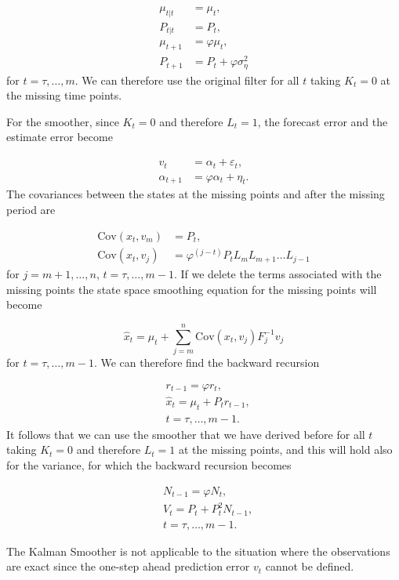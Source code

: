 \documentclass[11pt,a4paper]{article}
\newcommand{\cov}{\mathrm{Cov}}
\begin{document}
\begin{align*}
    \mu_{t|t} &= \mu_t,\\
    P_{t|t} &= P_t,\\
    \mu_{t+1} &= \varphi \mu_t,\\
    P_{t+1} &= P_t + \varphi \sigma^2_\eta
\end{align*}
for $t = \tau, \dots, m$. We can therefore use the original filter for all $t$ taking $K_t = 0$ at the missing time points.

For the smoother, since $K_t = 0$ and therefore $L_t = 1$, the forecast error and the estimate error become

\begin{align*}
    v_t &= \alpha_t + \varepsilon_t,\\
    \alpha_{t+1} &= \varphi \alpha_t + \eta_t.
\end{align*}
The covariances between the states at the missing points and after the missing period are

\begin{align*}
    \cov(x_t, v_m) &= P_t,\\
    \cov(x_t, v_j) &= \varphi^{(j-t)} P_t L_m L_{m+1} \dots L_{j-1}
\end{align*}
for $j = m+1, \dots, n$, $t = \tau, \dots, m - 1$.
If we delete the terms associated with the missing points the state space smoothing equation for the missing points will become

\[
    \hat{x}_t = \mu_t + \sum^n_{j=m}\cov (x_t, v_j)F_j^{-1}v_j
\]
for $t = \tau, \dots, m-1$. We can therefore find the backward recursion

\begin{align*}
    &r_{t-1} = \varphi r_t,\\
    &\hat{x}_t = \mu_t + P_t r_{t-1},\\
    &t = \tau, \dots, m-1.
\end{align*}
It follows that we can use the smoother that we have derived before for all $t$ taking $K_t = 0$ and therefore $L_t = 1$ at the missing points, and this will hold also for the variance, for which the backward recursion becomes

\begin{align*}
    &N_{t-1} = \varphi N_t,\\
    &V_t = P_t + P^2_t N_{t-1},\\
    &t = \tau, \dots, m-1.
\end{align*}

{\color{blue} The Kalman Smoother is not applicable to the situation where the observations are exact since the one-step ahead prediction error $v_t$ cannot be defined.}
\end{document}
